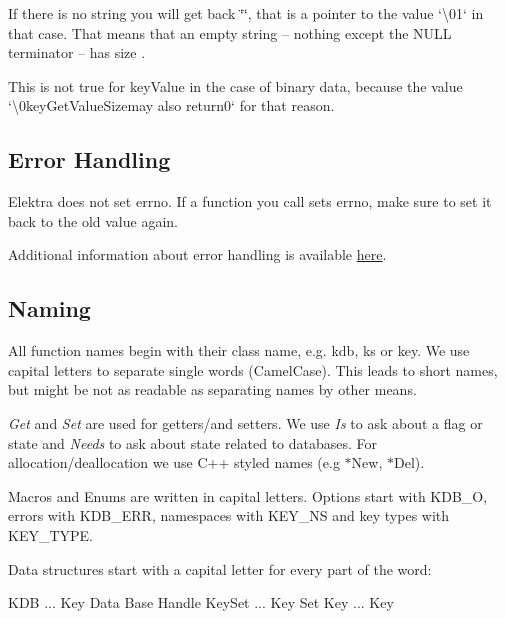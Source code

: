 If there is no string you will get back {\ttfamily \char`\"{}\char`\"{}}, that is a pointer to the value `\textquotesingle{}\textbackslash{}01` in that case. That means that an empty string – nothing except the N\+U\+LL terminator – has size {}.

This is not true for {\ttfamily key\+Value} in the case of binary data, because the value `\textquotesingle{}\textbackslash{}0key\+Get\+Value\+Size{\ttfamily may also return}0` for that reason.

\subsection*{Error Handling}

Elektra does not set {\ttfamily errno}. If a function you call sets {\ttfamily errno}, make sure to set it back to the old value again.

Additional information about error handling is available \hyperlink{doc_dev_error-handling_md}{here}.

\subsection*{Naming}

All function names begin with their class name, e.\+g. {\ttfamily kdb}, {\ttfamily ks} or {\ttfamily key}. We use capital letters to separate single words (Camel\+Case). This leads to short names, but might be not as readable as separating names by other means.

{\itshape Get} and {\itshape Set} are used for getters/and setters. We use {\itshape Is} to ask about a flag or state and {\itshape Needs} to ask about state related to databases. For allocation/deallocation we use C++ styled names (e.\+g {\ttfamily $\ast$\+New}, {\ttfamily $\ast$\+Del}).

Macros and Enums are written in capital letters. Options start with {\ttfamily K\+D\+B\+\_\+O}, errors with {\ttfamily K\+D\+B\+\_\+\+E\+RR}, namespaces with {\ttfamily K\+E\+Y\+\_\+\+NS} and key types with {\ttfamily K\+E\+Y\+\_\+\+T\+Y\+PE}.

Data structures start with a capital letter for every part of the word\+: \begin{DoxyVerb}KDB ... Key Data Base Handle
KeySet ... Key Set
Key ... Key
\end{DoxyVerb}


